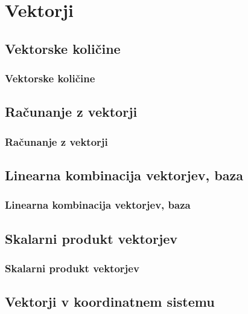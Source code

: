 \section{Vektorji}

\begin{frame}
    \sectionpage
\end{frame}

\begin{frame}
\end{frame}

    \subsection{Vektorske količine}

        \begin{frame}
            \frametitle{Vektorske količine}
        \end{frame}

    \subsection{Računanje z vektorji}

        \begin{frame}
            \frametitle{Računanje z vektorji}
        \end{frame}

    \subsection{Linearna kombinacija vektorjev, baza}

        \begin{frame}
            \frametitle{Linearna kombinacija vektorjev, baza}
        \end{frame}

    \subsection{Skalarni produkt vektorjev}

        \begin{frame}
            \frametitle{Skalarni produkt vektorjev}
        \end{frame}

    \subsection{Vektorji v koordinatnem sistemu}

